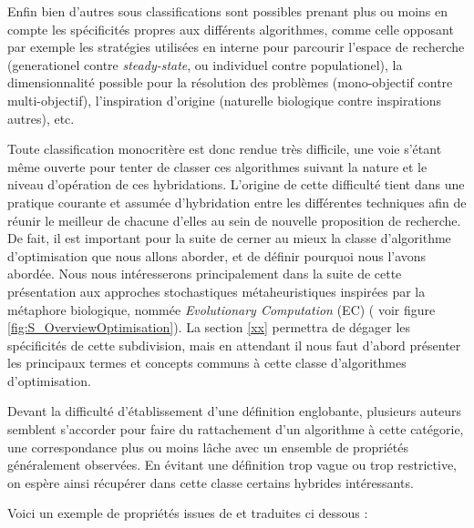 Enfin bien d'autres sous classifications sont possibles prenant plus ou moins en compte les spécificités propres aux différents algorithmes, comme celle opposant par exemple les stratégies utilisées en interne pour parcourir l'espace de recherche (generationel contre \textit{steady-state}, ou individuel contre populationel), la dimensionnalité possible pour la résolution des problèmes (mono-objectif contre multi-objectif), l'inspiration d'origine (naturelle biologique contre inspirations autres), etc.

Toute classification monocritère est donc rendue très difficile, une voie s'étant même ouverte pour tenter de classer ces algorithmes suivant la nature et le niveau d'opération de ces hybridations. L'origine de cette difficulté tient dans une pratique courante et assumée d'hybridation entre les différentes techniques afin de réunir le meilleur de chacune d'elles au sein de nouvelle proposition de recherche. De fait, il est important pour la suite de cerner au mieux la classe d'algorithme d'optimisation que nous allons aborder, et de définir pourquoi nous l'avons abordée. Nous nous intéresserons principalement dans la suite de cette présentation aux approches stochastiques métaheuristiques inspirées par la métaphore biologique, nommée \textit{Evolutionary Computation} (EC) ( voir figure \ref{fig:S_OverviewOptimisation}). La section \ref{xx} permettra de dégager les spécificités de cette subdivision, mais en attendant il nous faut d'abord présenter les principaux termes et concepts communs à cette classe d'algorithmes d'optimisation.

Devant la difficulté d'établissement d'une définition englobante, plusieurs auteurs semblent s'accorder pour faire du rattachement d'un algorithme à cette catégorie, une correspondance plus ou moins lâche avec un ensemble de propriétés généralement observées. En évitant une définition trop vague ou trop restrictive, on espère ainsi récupérer dans cette classe certains hybrides intéressants.

Voici un exemple de propriétés issues de \textcite{Blum2003} et traduites ci dessous :

